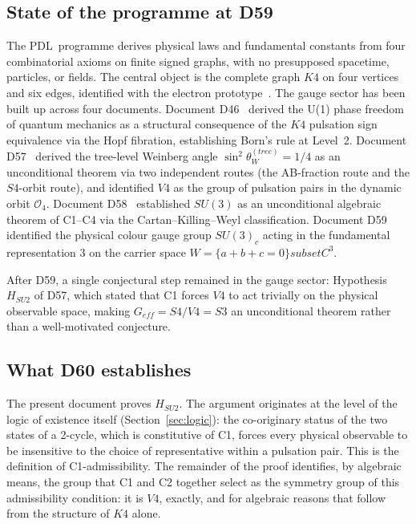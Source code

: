 \documentclass[11pt,a4paper]{article}
\def\Sfour{S4}%
\def\Vfour{V4}%
\def\Sthree{S3}%
\def\SUthree{SU(3)}%
\def\Kfour{K4}%
\def\PDL{PDL}%
\def\cong{=}%
\def\subset{ subset }%
\def\mathbb#1{#1}%
\def\mathrm#1{#1}%
\def\mathbf#1{#1}%
\def\textsc#1{#1}%
\theoremstyle{plain}
\theoremstyle{definition}
\theoremstyle{remark}
\newcommand{\PDL}{\textsc{PDL}}
\newcommand{\Kfour}{K_4}
\newcommand{\Sfour}{S_4}
\newcommand{\Vfour}{V_4}
\newcommand{\Sthree}{S_3}
\newcommand{\SUthree}{\mathrm{SU}(3)}
\newcommand{\Orb}[1]{\mathcal{O}_{#1}}
\begin{document}
\subsection{State of the programme at D59}

The \PDL\ programme derives physical laws and fundamental constants from four combinatorial
axioms on finite signed graphs, with no presupposed spacetime, particles, or fields. The
central object is the complete graph $\Kfour$ on four vertices and six edges, identified with
the electron prototype~\cite{PDL_D16a}. The gauge sector has been built up across four
documents. Document D46~\cite{PDL_D46} derived the U(1) phase freedom of quantum mechanics
as a structural consequence of the $\Kfour$ pulsation sign equivalence via the Hopf
fibration, establishing Born's rule at Level~2. Document D57~\cite{PDL_D57} derived the
tree-level Weinberg angle $\sin^2\theta_W^{(\mathrm{tree})} = 1/4$ as an unconditional
theorem via two independent routes (the AB-fraction route and the $\Sfour$-orbit route),
and identified $\Vfour$ as the group of pulsation pairs in the dynamic orbit $\Orb{4}$.
Document D58~\cite{PDL_D58} established $\SUthree$ as an unconditional algebraic theorem of
C1--C4 via the Cartan--Killing--Weyl classification. Document D59~\cite{PDL_D59} identified
the physical colour gauge group $\SUthree_c$ acting in the fundamental representation
$\mathbf{3}$ on the carrier space $W = \{a+b+c=0\} \subset \mathbb{C}^3$.

After D59, a single conjectural step remained in the gauge sector: Hypothesis~$\mathrm{H_{SU2}}$
of D57, which stated that C1 forces $\Vfour$ to act trivially on the physical observable space,
making $G_{\mathrm{eff}} = \Sfour/\Vfour \cong \Sthree$ an unconditional theorem rather than
a well-motivated conjecture.

\subsection{What D60 establishes}

The present document proves $\mathrm{H_{SU2}}$. The argument originates at the level of
the logic of existence itself (Section~\ref{sec:logic}): the co-originary status of the two
states of a 2-cycle, which is constitutive of C1, forces every physical observable to be
insensitive to the choice of representative within a pulsation pair. This is the definition
of C1-admissibility. The remainder of the proof identifies, by algebraic means, the group
that C1 and C2 together select as the symmetry group of this admissibility condition: it is
$\Vfour$, exactly, and for algebraic reasons that follow from the structure of $\Kfour$ alone.
\end{document}
